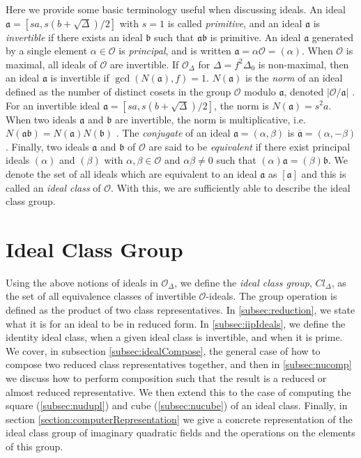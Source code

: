 \documentclass{ucalgthes1}
\theoremstyle{plain}
\theoremstyle{definition}
\newcommand{\OO}{\mathcal{O}}
\begin{document}
Here we provide some basic terminology useful when discussing ideals.  An ideal $\mathfrak{a} = [sa, s(b+\sqrt{\Delta})/2]$ with $s=1$ is called \emph{primitive}, and an ideal $\mathfrak{a}$ is \emph{invertible} if there exists an ideal $\mathfrak{b}$ such that $\mathfrak{a}\mathfrak{b}$ is primitive.  An ideal $\mathfrak{a}$ generated by a single element $\alpha \in \OO$ is \emph{principal}, and is written $\mathfrak{a} = \alpha \OO = (\alpha)$.  When $\OO$ is maximal, all ideals of $\OO$ are invertible.  If $\OO_\Delta$ for $\Delta = f^2\Delta_0$ is non-maximal, then an ideal $\mathfrak{a}$ is invertible if $\gcd(N(\mathfrak{a}),f)=1$.  $N(\mathfrak{a})$ is the \emph{norm} of an ideal defined as the number of distinct cosets in the group $\OO$ modulo $\mathfrak{a}$, denoted $|\OO/\mathfrak{a}|$ \cite[pp.~90-91]{Jac09}.  For an invertible ideal $\mathfrak{a} = [sa, s(b+\sqrt{\Delta})/2]$, the norm is $N(\mathfrak{a}) = s^2a$.  When two ideals $\mathfrak{a}$ and $\mathfrak{b}$ are invertible, the norm is multiplicative, i.e. $N(\mathfrak{a}\mathfrak{b}) = N(\mathfrak{a})N(\mathfrak{b})$ \cite[p.~92]{Jac09}.  The \emph{conjugate} of an ideal $\mathfrak{a} = (\alpha, \beta)$ is $\overline{\mathfrak{a}} = (\alpha, -\beta)$.  Finally, two ideals $\mathfrak{a}$ and $\mathfrak{b}$ of $\OO$ are said to be \emph{equivalent} if there exist principal ideals $(\alpha)$ and $(\beta)$ with  $\alpha, \beta \in \OO$ and $\alpha\beta \neq 0$ such that $(\alpha)\mathfrak{a} = (\beta)\mathfrak{b}$.  We denote the set of all ideals which are equivalent to an ideal $\mathfrak{a}$ as $[\mathfrak{a}]$ and this is called an \emph{ideal class} of $\OO$.  With this, we are  sufficiently able to describe the ideal class group.


\bigbreak
\section{Ideal Class Group}

Using the above notions of ideals in $\OO_\Delta$, we define the \emph{ideal class group}, $Cl_\Delta$, as the set of all equivalence classes of invertible $\OO$-ideals.  The group operation is defined as the product of two class representatives.  In \ref{subsec:reduction}, we state what it is for an ideal to be in reduced form.  In \ref{subsec:iipIdeals}, we define the identity ideal class, when a given ideal class is invertible, and when it is prime.  We cover, in subsection \ref{subsec:idealCompose}, the general case of how to compose two reduced class representatives together, and then in \ref{subsec:nucomp} we discuss how to perform composition such that the result is a reduced or almost reduced representative.  We then extend this to the case of computing the square (\ref{subsec:nudupl}) and cube (\ref{subsec:nucube}) of an ideal class.  Finally, in section \ref{section:computerRepresentation} we give a concrete representation of the ideal class group of imaginary quadratic fields and the operations on the elements of this group. 
\end{document}
